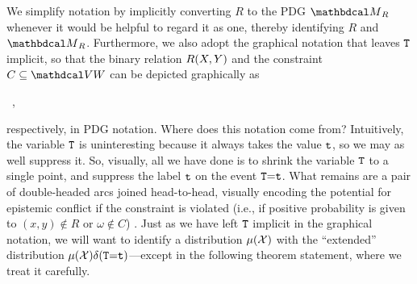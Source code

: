 We simplify notation by implicitly converting $R$ to the PDG $\PDGof{R}$ 
whenever it would be helpful to regard it as one, thereby identifying $R$ and $\PDGof{R}$. 
Furthermore, we also adopt the graphical notation 
that leaves ${\tt T}$ implicit, so that the binary relation $R({X},{Y})$ and the
    constraint $C \subseteq \V \var W$ can be depicted graphically as
\begin{center}
    \hspace{2em}\hspace{2em}
    ~,
\end{center}
respectively, in PDG notation.
Where does this notation come from?
Intuitively, the variable ${\tt T}$ is uninteresting because it always takes the value ${\tt t}$, so we may as well suppress it. 
So, visually, all we have done is to shrink the variable ${\tt T}$ to a single point, and suppress the label ${\tt t}$ on the event ${\tt T}{=}{\tt t}$.
What remains are a pair of double-headed arcs joined head-to-head,
visually encoding the potential for epistemic
    conflict if the constraint is violated
(i.e., if positive probability is given to $(x,y) \notin R$ or $\omega \notin C$)
\unskip.
Just as we have left ${\tt T}$ implicit in the graphical notation,
we will want to identify a distribution $\mu(\mathcal X)$ with 
the ``extended'' distribution $\mu(\mathcal X) \delta({\tt T}{=}{\tt t})$---except
in the following theorem statement, where we treat it carefully.


